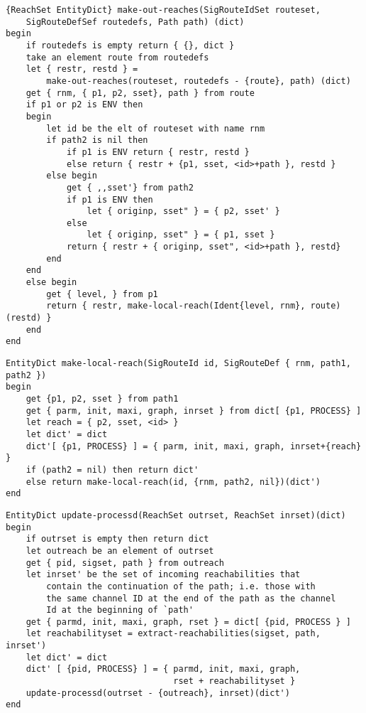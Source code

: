 \begin{verbatim}
{ReachSet EntityDict} make-out-reaches(SigRouteIdSet routeset,
    SigRouteDefSef routedefs, Path path) (dict)
begin
    if routedefs is empty return { {}, dict }
    take an element route from routedefs
    let { restr, restd } = 
        make-out-reaches(routeset, routedefs - {route}, path) (dict)
    get { rnm, { p1, p2, sset}, path } from route
    if p1 or p2 is ENV then
    begin
        let id be the elt of routeset with name rnm
        if path2 is nil then
            if p1 is ENV return { restr, restd }
            else return { restr + {p1, sset, <id>+path }, restd }
        else begin
            get { ,,sset'} from path2
            if p1 is ENV then
                let { originp, sset" } = { p2, sset' }
            else
                let { originp, sset" } = { p1, sset }
            return { restr + { originp, sset", <id>+path }, restd}
        end
    end
    else begin
        get { level, } from p1
        return { restr, make-local-reach(Ident{level, rnm}, route)(restd) }
    end
end
\end{verbatim}

\begin{verbatim}
EntityDict make-local-reach(SigRouteId id, SigRouteDef { rnm, path1, path2 })
begin
    get {p1, p2, sset } from path1
    get { parm, init, maxi, graph, inrset } from dict[ {p1, PROCESS} ]
    let reach = { p2, sset, <id> }
    let dict' = dict
    dict'[ {p1, PROCESS} ] = { parm, init, maxi, graph, inrset+{reach} }
    if (path2 = nil) then return dict'
    else return make-local-reach(id, {rnm, path2, nil})(dict')
end
\end{verbatim}

\begin{verbatim}
EntityDict update-processd(ReachSet outrset, ReachSet inrset)(dict)
begin
    if outrset is empty then return dict
    let outreach be an element of outrset
    get { pid, sigset, path } from outreach
    let inrset' be the set of incoming reachabilities that
        contain the continuation of the path; i.e. those with
        the same channel ID at the end of the path as the channel
        Id at the beginning of `path'
    get { parmd, init, maxi, graph, rset } = dict[ {pid, PROCESS } ]
    let reachabilityset = extract-reachabilities(sigset, path, inrset')
    let dict' = dict
    dict' [ {pid, PROCESS} ] = { parmd, init, maxi, graph, 
                                 rset + reachabilityset }
    update-processd(outrset - {outreach}, inrset)(dict')
end
\end{verbatim}

